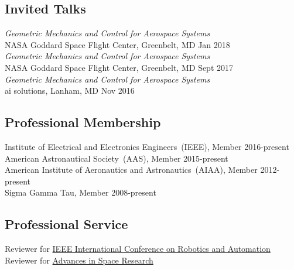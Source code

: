 
\subsection*{Invited Talks}
{}
\textit{Geometric Mechanics and Control for Aerospace Systems} \\NASA Goddard Space Flight Center, Greenbelt, MD \hfill {Jan 2018}\\
\textit{Geometric Mechanics and Control for Aerospace Systems} \\NASA Goddard Space Flight Center, Greenbelt, MD \hfill {Sept 2017}\\
\textit{Geometric Mechanics and Control for Aerospace Systems} \\ai solutions, Lanham, MD \hfill {Nov 2016}

\subsection*{Professional Membership}
{}
Institute of Electrical and Electronics Engineers~(IEEE), Member \hfill {2016-present} \\
American Astronautical Society~(AAS), Member \hfill {2015-present} \\
American Institute of Aeronautics and Astronautics~(AIAA), Member \hfill {2012-present} \\
Sigma Gamma Tau, Member \hfill  {2008-present} \\

\subsection*{Professional Service}
Reviewer for \href{http://www.ieee-ras.org/conferences-workshops/fully-sponsored/icra}{IEEE International Conference on Robotics and Automation}
Reviewer for \href{http://www.journals.elsevier.com/advances-in-space-research/}{Advances in Space Research}
